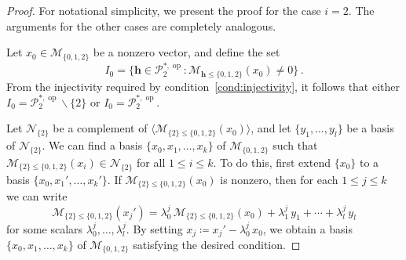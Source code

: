 \documentclass[reqno,12pt]{amsart}
\newcommand{\cM}{\mathcal{M}}
\newcommand{\cN}{\mathcal{N}}
\newcommand{\cP}{\mathcal{P}}
\DeclareMathOperator{\op}{op}
\newcommand{\0}{\mathbf 0}
\newcommand{\h}{\mathbf{h}}
\theoremstyle{definition}
\begin{document}
\begin{proof} For notational simplicity, we present the proof for the case $i=2$. The arguments for the other cases are completely analogous.

    Let $x_0\in \cM_{\{0,1,2\}}$ be a nonzero vector, and define the set
    \[
    I_0=\{\h\in \cP^{*,\op}_2 : \cM_{\h\leq \{0,1,2\}}(x_0)\neq 0\}\, .
    \]
    From the injectivity required by condition~\eqref{cond:injectivity}, it follows that either $I_0=\cP^{*,\op}_2\smallsetminus\{2\}$ or $I_0=\cP^{*,\op}_2$.

    Let $\cN_{\{2\}}$ be a complement of $\langle \cM_{\{2\}\leq\{0,1,2\}}(x_0)\rangle$, and let $\{y_1,\dots,y_l\}$ be a basis of $\cN_{\{2\}}$. We can find a basis $\{x_0,x_1,\dots,x_k\}$ of $\cM_{\{0,1,2\}}$ such that $\cM_{\{2\}\leq\{0,1,2\}}(x_i)\in \cN_{\{2\}}$ for all $1\leq i\leq k$. To do this, first extend $\{x_0\}$ to a basis $\{x_0,x_1',\dots,x_k'\}$. If $\cM_{\{2\}\leq\{0,1,2\}}(x_0)$ is nonzero, then for each $1\leq j\leq k$ we can write
    \[
    \cM_{\{2\}\leq\{0,1,2\}}(x_j')=\lambda_0^j\, \cM_{\{2\}\leq\{0,1,2\}}(x_0)+\lambda_1^j \,y_1+\cdots+\lambda_l^j\,y_l
    \]
    for some scalars $\lambda_0^j, \dots, \lambda_l^j$. By setting $x_j\coloneqq x_j'-\lambda_0^j\,x_0$, we obtain a basis $\{x_0,x_1,\dots,x_k\}$ of $\cM_{\{0,1,2\}}$ satisfying the desired condition.


\end{proof}
\end{document}

